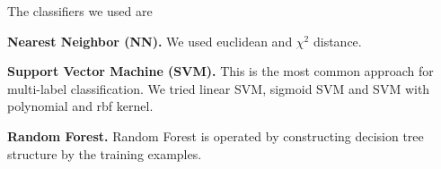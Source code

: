 The classifiers we used are

\textbf{Nearest Neighbor (NN).} We used euclidean and $\chi^2$ distance.

\textbf{Support Vector Machine (SVM).} This is the most common approach for multi-label classification. We tried linear SVM, sigmoid SVM and SVM with polynomial and rbf kernel.


\textbf{Random Forest.} 
Random Forest is operated by constructing decision tree structure by the training examples. \